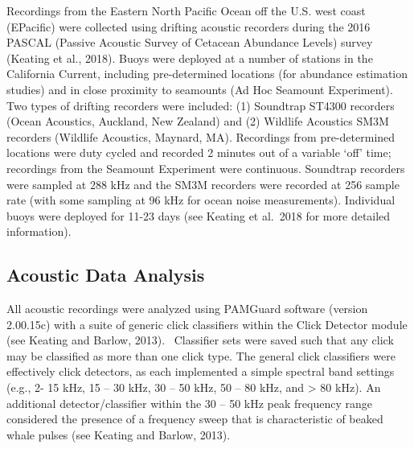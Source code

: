 \documentclass[
  letterpaper,
  DIV=11,
  numbers=noendperiod]{scrartcl}
\begin{document}
Recordings from the Eastern North Pacific Ocean off the U.S. west coast
(EPacific) were collected using drifting acoustic recorders during the
2016 PASCAL (Passive Acoustic Survey of Cetacean Abundance Levels)
survey (Keating et al., 2018). Buoys were deployed at a number of
stations in the California Current, including pre-determined locations
(for abundance estimation studies) and in close proximity to seamounts
(Ad Hoc Seamount Experiment). Two types of drifting recorders were
included: (1) Soundtrap ST4300 recorders (Ocean Acoustics, Auckland, New
Zealand) and (2) Wildlife Acoustics SM3M recorders (Wildlife Acoustics,
Maynard, MA). Recordings from pre-determined locations were duty cycled
and recorded 2 minutes out of a variable `off' time; recordings from the
Seamount Experiment were continuous. Soundtrap recorders were sampled at
288 kHz and the SM3M recorders were recorded at 256 sample rate (with
some sampling at 96 kHz for ocean noise measurements). Individual buoys
were deployed for 11-23 days (see Keating et al.~2018 for more detailed
information).

\hypertarget{acoustic-data-analysis}{%
\subsection{Acoustic Data Analysis}\label{acoustic-data-analysis}}

All acoustic recordings were analyzed using PAMGuard software (version
2.00.15c) with a suite of generic click classifiers within the Click
Detector module (see Keating and Barlow, 2013).~ Classifier sets were
saved such that any click may be classified as more than one click type.
The general click classifiers were effectively click detectors, as each
implemented a simple spectral band settings (e.g., 2- 15 kHz, 15 -- 30
kHz, 30 -- 50 kHz, 50 -- 80 kHz, and \textgreater{} 80 kHz). An
additional detector/classifier within the 30 -- 50 kHz peak frequency
range considered the presence of a frequency sweep that is
characteristic of beaked whale pulses (see Keating and Barlow, 2013).
\end{document}
